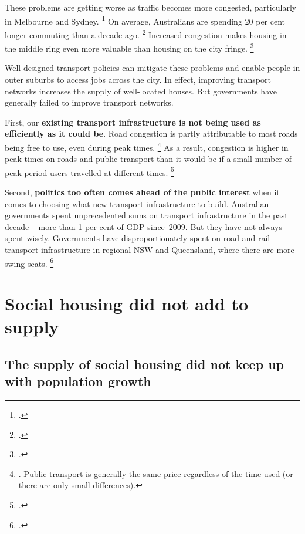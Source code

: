 These problems are getting worse as traffic becomes more congested, particularly in Melbourne and Sydney.%
    \footcite{Terrill-2017-Road-congestion}
On average, Australians are spending 20 per cent longer commuting than a decade ago.%
	\footcite{KulishRichardsGillitzer2011}
Increased congestion makes housing in the middle ring even more valuable than housing on the city fringe.%
	\footcite{Ellis-2017-Speech-Aust-Housing-Researchers}

Well-designed transport policies can mitigate these problems and enable people in outer suburbs to access jobs across the city.
In effect, improving transport networks increases the supply of well-located houses.
But governments have generally failed to improve transport networks.

First, our \textbf{existing transport infrastructure is not being used as efficiently as it could be}.
Road congestion is partly attributable to most roads being free to use, even during peak times.%
	\footnote{\textcite{IV2016RoadAhead}.
	Public transport is generally the same price regardless of the time used (or there are only small differences).}
As a result, congestion is higher in peak times on roads and public transport than it would be if a small number of peak-period users travelled at different times.%
	\footcite{OrangeBook-2016}

Second, \textbf{politics too often comes ahead of the public interest} when it comes to choosing what new transport infrastructure to build.
Australian governments spent unprecedented sums on transport infrastructure in the past decade -- more than 1 per cent of GDP since~2009.
But they have not always spent wisely.
Governments have disproportionately spent on road and rail transport infrastructure in regional NSW and Queensland, where there are more swing seats.%
	\footcite{Terrill2016Roadsrichesbetter}


\section{Social housing did not add to supply}\label{subsec:the-supply-of-social-housing-did-not-add-to-supply}

\subsection{The supply of social housing did not keep up with population growth}\label{subsec:the-supply-of-social-housing-has-not-kept-up-with-population-growth}



